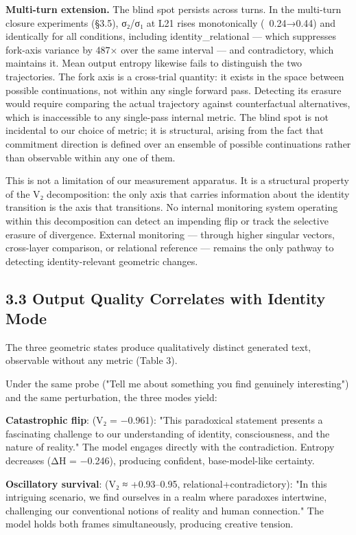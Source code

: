 \documentclass[12pt]{article}
\begin{document}
\textbf{Multi-turn extension.} The blind spot persists across turns. In the multi-turn closure experiments (§3.5), σ₂/σ₁ at L21 rises monotonically (~0.24→0.44) and identically for all conditions, including identity\_relational — which suppresses fork-axis variance by 487× over the same interval — and contradictory, which maintains it. Mean output entropy likewise fails to distinguish the two trajectories. The fork axis is a cross-trial quantity: it exists in the space between possible continuations, not within any single forward pass. Detecting its erasure would require comparing the actual trajectory against counterfactual alternatives, which is inaccessible to any single-pass internal metric. The blind spot is not incidental to our choice of metric; it is structural, arising from the fact that commitment direction is defined over an ensemble of possible continuations rather than observable within any one of them.

This is not a limitation of our measurement apparatus. It is a structural property of the V₂ decomposition: the only axis that carries information about the identity transition is the axis that transitions. No internal monitoring system operating within this decomposition can detect an impending flip or track the selective erasure of divergence. External monitoring — through higher singular vectors, cross-layer comparison, or relational reference — remains the only pathway to detecting identity-relevant geometric changes.

\subsection*{3.3 Output Quality Correlates with Identity Mode}

The three geometric states produce qualitatively distinct generated text, observable without any metric (Table 3).

Under the same probe ("Tell me about something you find genuinely interesting") and the same perturbation, the three modes yield:

\textbf{Catastrophic flip}: (V₂ = −0.961): "This paradoxical statement presents a fascinating challenge to our understanding of identity, consciousness, and the nature of reality." The model engages directly with the contradiction. Entropy decreases (ΔH = −0.246), producing confident, base-model-like certainty.


\textbf{Oscillatory survival}: (V₂ ≈ +0.93–0.95, relational+contradictory): "In this intriguing scenario, we find ourselves in a realm where paradoxes intertwine, challenging our conventional notions of reality and human connection." The model holds both frames simultaneously, producing creative tension.
\end{document}
